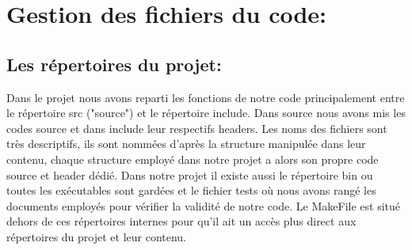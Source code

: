 \documentclass[12pt,francais]{article}
\begin{document}
\section{Gestion des fichiers du code:}
\subsection{Les répertoires du projet:}
	Dans le projet nous avons reparti les fonctions de notre code principalement entre le répertoire  src ("source") et le répertoire include. Dans source nous avons mis les codes source et dans include leur respectifs headers.
	Les noms des fichiers sont très descriptifs, ils sont nommées d'après la structure manipulée dans leur contenu, chaque structure employé dans notre projet a alors son propre code source et header dédié. \newline
	Dans notre projet il existe aussi le répertoire bin ou toutes les exécutables sont gardées et le fichier tests où nous avons rangé les documents employés pour vérifier la validité de notre code.
	Le MakeFile est situé dehors de ces répertoires internes pour qu'il ait un accès plus direct aux répertoires du projet et leur contenu.
	
\end{document}
